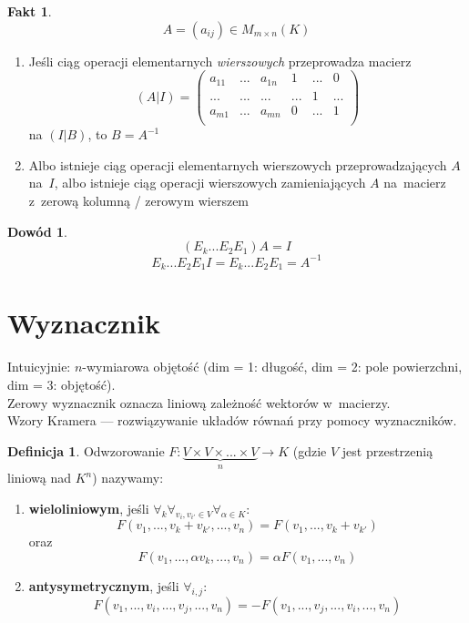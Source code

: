 \documentclass[12pt,a4paper]{article}
\theoremstyle{plain}
\theoremstyle{definition}
\newtheorem{ft}{Fakt}[section]
\theoremstyle{definition}
\newtheorem{df}{Definicja}[section]
\theoremstyle{definition}
\theoremstyle{definition}
\newtheorem*{dd}{Dowód}
\theoremstyle{definition}
\theoremstyle{definition}
\theoremstyle{definition}
\theoremstyle{definition}
\theoremstyle{definition}
\begin{document}
\begin{ft}
    \[A = (a_{ij}) \in M_{m\times n}(K)\]
  \begin{enumerate}
    \item Jeśli ciąg operacji elementarnych \textit{wierszowych} przeprowadza
      macierz \[(A|I)=\begin{pmatrix}
        a_{11}&...&a_{1n}& 1 &...& 0 \\
        ...&...&...&...& 1 &...\\
        a_{m1}&...&a_{mn}& 0 &...& 1 \\
      \end{pmatrix}\]
      na $(I|B)$, to $B = A^{-1}$
    \item Albo istnieje ciąg operacji elementarnych wierszowych
      przeprowadzających $A$ na~$I$, albo istnieje ciąg operacji
      wierszowych zamieniających $A$ na~macierz z~zerową kolumną /
      zerowym wierszem
  \end{enumerate}
\end{ft}

\begin{dd}
    \[(E_k...E_2E_1)A=I\]
  \[E_k...E_2E_1I=E_k...E_2E_1=A^{-1}\]
\end{dd}

\section{Wyznacznik}
    Intuicyjnie: $n$-wymiarowa objętość (dim = 1: długość, dim = 2: pole powierzchni, dim = 3: objętość). \\
    Zerowy wyznacznik oznacza liniową zależność wektorów w~macierzy. \\
    Wzory Kramera --- rozwiązywanie układów równań przy pomocy wyznaczników.

\begin{df}
    Odwzorowanie
  $F: \underbrace{V \times V \times ... \times V}_{n} \rightarrow K$
  (gdzie $V$ jest przestrzenią liniową nad $K^n$) nazywamy:
  \begin{enumerate}
    \item \textbf{wieloliniowym}, jeśli
      $\forall_k\forall_{v_i,v_{i'}\in V}\forall_{\alpha\in K}$:
      \[F(v_1, ..., v_k+v_{k'}, ..., v_n)
      = F(v_1, ..., v_k+v_{k'})\]
      oraz
      \[F(v_1, ..., \alpha v_k, ..., v_n) = \alpha F(v_1, ..., v_n)\]
    \item \textbf{antysymetrycznym}, jeśli $\forall_{i,j}$:
      \[F(v_1, ..., v_i, ..., v_j, ..., v_n)
      = -F(v_1, ..., v_j, ..., v_i, ..., v_n)\]
  \end{enumerate}
\end{df}
\end{document}
